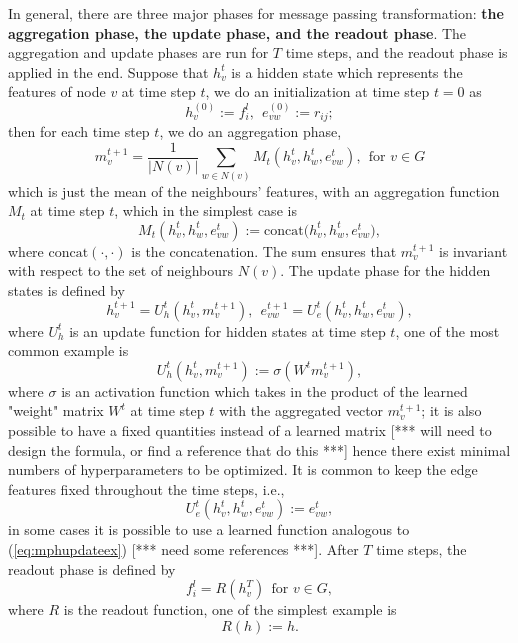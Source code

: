 \documentclass[12pt]{article}
\def\att{                    %
        \marginpar[ \hspace*{\fill} \raisebox{-0.2em}{\rule{2mm}{1.2em}} ]
        {\raisebox{-0.2em}{\rule{2mm}{1.2em}} }
        }
\def\at#1{[*** \att #1 ***]}  %
\begin{document}
In general, there are three major phases for message passing transformation: \textbf{the aggregation phase, the update phase, and the readout phase}.
The aggregation and update phases are run for $T$ time steps, and the readout phase is applied in the end.
Suppose that $h_v^t$ is a hidden state which represents the features of node $v$ at time step $t$, we do an initialization at time step $t = 0$ as
\begin{equation}
	\label{eq:mpinit}
	h_v^{(0)} := f_i^l, ~~ e_{vw}^{(0)} := r_{ij};
\end{equation}
then for each time step $t$, we do an aggregation phase,
\begin{equation}
	\label{eq:mpagg}
	m^{t+1}_v = \frac{1}{|N(v)|}\sum_{w \in N(v)} M_t(h_v^t, h_w^t, e_{vw}^t),~~ \text{for }v \in G
\end{equation}
which is just the mean of the neighbours' features, with an aggregation function $M_t$ at time step $t$, which in the simplest case is
\begin{equation}
	\label{eq:mpaggex}
	M_t(h_v^t, h_w^t, e_{vw}^t) :=  \text{concat}\Big(h_v^t, h_w^t, e_{vw}^t\Big),
\end{equation}
where $\text{concat}(\cdot, \cdot)$ is the concatenation. The sum ensures that $m^{t+1}_v$ is invariant with respect to the set of neighbours $N(v)$.
The update phase for the hidden states is defined by
\begin{equation}
	\label{eq:mpupdate}
	h_v^{t+1} = U^t_h(h_v^t, m^{t+1}_v), ~~ e_{vw}^{t+1} = U^t_e(h_v^t, h_w^t, e_{vw}^t),
\end{equation}
where $U^t_h$ is an update function for hidden states at time step $t$, one of the most common example is
\begin{equation}
	\label{eq:mphupdateex}
	U^t_h(h_v^t, m^{t+1}_v) := \sigma(W^tm^{t+1}_v), 
\end{equation}
where $\sigma$ is an activation function which takes in the product of the learned "weight" matrix $W^t$ at time step $t$ with the aggregated vector $m^{t+1}_v$; 
it is also possible to have a fixed quantities instead of a learned matrix \at{will need to design the formula, or find a reference that do this} hence there exist minimal numbers of hyperparameters to be optimized. It is common to keep the edge features fixed throughout the time steps, i.e.,
\begin{equation}
	\label{eq:mpeupdateex}
	U^t_e(h_v^t, h_w^t, e_{vw}^t) := e_{vw}^t,
\end{equation}
in some cases it is possible to use a learned function analogous to (\ref{eq:mphupdateex}) \at{need some references}. After $T$ time steps, the readout phase is defined by
\begin{equation}
	\label{eq:mpreadout}
	f_i^l = R(h_v^T) ~~ \text{for }v \in G,
\end{equation}
where $R$ is the readout function, one of the simplest example is
\begin{equation}
	\label{eq:mpreadoutex}
	R(h) := h.
\end{equation}
\end{document}
